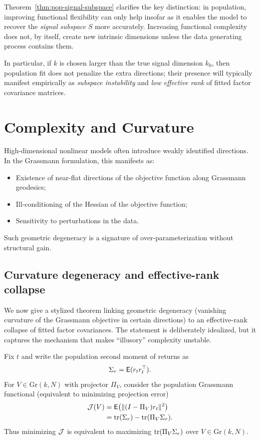 \documentclass[twoside,11pt,letter]{article}
\begin{document}
Theorem~\ref{thm:pop-signal-subspace} clarifies the key distinction: in population, improving functional flexibility can only help insofar as it enables the model to recover the \emph{signal subspace} $S$ more accurately. Increasing functional complexity does not, by itself, create new intrinsic dimensions unless the data generating process contains them.

In particular, if $k$ is chosen larger than the true signal dimension $k_0$, then population fit does not penalize the extra directions; their presence will typically manifest empirically as \emph{subspace instability} and \emph{low effective rank} of fitted factor covariance matrices.


\section{Complexity and Curvature}

High-dimensional nonlinear models often introduce weakly identified directions. In the Grassmann formulation, this manifests as:
\begin{itemize}
\item[(i)] Existence of near-flat directions of the objective function along Grassmann geodesics;
\item[(ii)] Ill-conditioning of the Hessian of the objective function;
\item[(iii)] Sensitivity to perturbations in the data.
\end{itemize}
Such geometric degeneracy is a signature of over-parameterization without structural gain.


\subsection{Curvature degeneracy and effective-rank collapse}

We now give a stylized theorem linking geometric degeneracy (vanishing curvature of the Grassmann objective in certain directions) to an effective-rank collapse of fitted factor covariances. The statement is deliberately idealized, but it captures the mechanism that makes ``illusory'' complexity unstable.

\medskip

Fix $t$ and write the population second moment of returns as
\begin{equation}\label{eq:Sigma-r}
\Sigma_r = \mathsf{E}(r_t r_t^\top).
\end{equation}
For $V\in \mathrm{Gr}(k,N)$ with projector $\Pi_V$, consider the population Grassmann functional (equivalent to minimizing projection error)
\begin{equation}\label{eq:pop-grass-functional}
\begin{split}
{\mathcal{J}}(V) &=\mathsf{E}\big(\|(I-\Pi_V) r_t\|^2\big)\\
&=\mathrm{tr}(\Sigma_r) - \mathrm{tr}(\Pi_V \Sigma_r).
\end{split}
\end{equation}
Thus minimizing ${\mathcal{J}}$ is equivalent to maximizing $\mathrm{tr}(\Pi_V \Sigma_r)$ over
$V\in \mathrm{Gr}(k,N)$.
\end{document}
